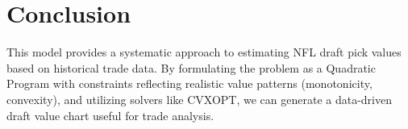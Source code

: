 \documentclass{article}
\begin{document}
\section{Conclusion}

This model provides a systematic approach to estimating NFL draft pick values based on historical trade data. By formulating the problem as a Quadratic Program with constraints reflecting realistic value patterns (monotonicity, convexity), and utilizing solvers like CVXOPT, we can generate a data-driven draft value chart useful for trade analysis.
\end{document}
